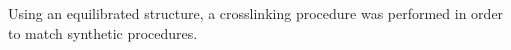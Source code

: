 \documentclass{article}
\newcommand{\angstrom}{\textup{\AA}}
\begin{document}


  Using an equilibrated structure, a crosslinking procedure was performed
  in order to match synthetic procedures.
\end{document}
